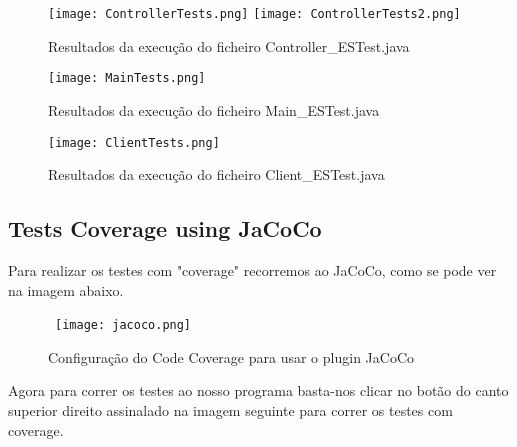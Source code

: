\begin{figure}[H]

  \centering

  \texttt{[image: ControllerTests.png]}
  \texttt{[image: ControllerTests2.png]}
  \caption {Resultados da execução do ficheiro Controller\_ESTest.java}

  \label {fig39}

\end{figure}
\begin{figure}[H]

  \centering

  \texttt{[image: MainTests.png]}

  \caption {Resultados da execução do ficheiro Main\_ESTest.java}

  \label {fig40}

\end{figure}
\begin{figure}[H]

  \centering

  \texttt{[image: ClientTests.png]}

  \caption {Resultados da execução do ficheiro Client\_ESTest.java}

  \label {fig41}

\end{figure}

\newpage
\subsection{Tests Coverage using JaCoCo}

\par Para realizar os testes com "coverage"  recorremos ao JaCoCo, como se pode ver na imagem abaixo.

\begin{figure}[H]

  \centering

  \hbox{\hspace{-8em}  \texttt{[image: jacoco.png]}}

  \caption {Configuração do Code Coverage para usar o  plugin JaCoCo}

  \label {fig42}

\end{figure}

\par Agora para correr os testes ao nosso programa basta-nos clicar no botão do canto superior direito assinalado na imagem seguinte para correr os testes com coverage.

